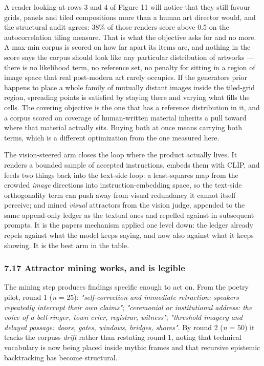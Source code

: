 \documentclass[
  10pt,
]{article}
\theoremstyle{plain}
\theoremstyle{definition}
\begin{document}
A reader looking at rows 3 and 4 of Figure 11 will notice that they
still favour grids, panels and tiled compositions more than a human art
director would, and the structural audit agrees: 38\% of those renders
score above 0.5 on the autocorrelation tiling measure. That is what the
objective asks for and no more. A max-min corpus is scored on how far
apart its items are, and nothing in the score says the corpus should
look like any particular distribution of artworks --- there is no
likelihood term, no reference set, no penalty for sitting in a region of
image space that real post-modern art rarely occupies. If the
generator\textquotesingle s prior happens to place a whole family of
mutually distant images inside the tiled-grid region, spreading points
is satisfied by staying there and varying what fills the cells. The
covering objective is the one that has a reference distribution in it,
and a corpus scored on coverage of human-written material inherits a
pull toward where that material actually sits. Buying both at once means
carrying both terms, which is a different optimization from the one
measured here.

The vision-steered arm closes the loop where the product actually lives.
It renders a bounded sample of accepted instructions, embeds them with
CLIP, and feeds two things back into the text-side loop: a least-squares
map from the crowded \emph{image} directions into instruction-embedding
space, so the text-side orthogonality term can push away from visual
redundancy it cannot itself perceive; and mined \emph{visual} attractors
from the vision judge, appended to the same append-only ledger as the
textual ones and repelled against in subsequent prompts. It is the
paper\textquotesingle s mechanism applied one level down: the ledger
already repels against what the model keeps saying, and now also against
what it keeps showing. It is the best arm in the table.

\subsubsection{7.17 Attractor mining works, and is
legible}\label{717-attractor-mining-works-and-is-legible}

The mining step produces findings specific enough to act on. From the
poetry pilot, round 1 (\emph{n} = 25): \emph{"self-correction and
immediate retraction: speakers repeatedly interrupt their own claims"};
\emph{"ceremonial or institutional address: the voice of a bell-ringer,
town crier, registrar, witness"}; \emph{"threshold imagery and delayed
passage: doors, gates, windows, bridges, shores"}. By round 2 (\emph{n}
= 50) it tracks the corpus\textquotesingle s \emph{drift} rather than
restating round 1, noting that technical vocabulary is now being placed
inside mythic frames and that recursive epistemic backtracking has
become structural.
\end{document}

